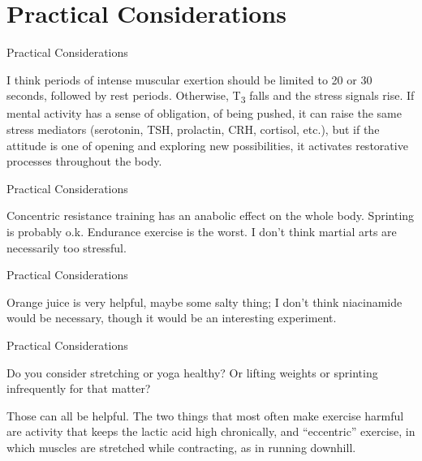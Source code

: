 \documentclass[11pt,oneside,openany,extrafontsizes]{memoir}
\begin{document}
\section{Practical Considerations}

\begin{standalonequote}{Practical Considerations}

    \begin{answer}
        I think periods of intense muscular exertion should be limited to 20 or 30 seconds, followed by rest periods. Otherwise, T\textsubscript{3} falls and the stress signals rise. If mental activity has a sense of obligation, of being pushed, it can raise the same stress mediators (serotonin, TSH, prolactin, CRH, cortisol, etc.), but if the attitude is one of opening and exploring new possibilities, it activates restorative processes throughout the body.
    \end{answer}
\end{standalonequote}

\begin{standalonequote}{Practical Considerations}

    \begin{answer}
        Concentric resistance training has an anabolic effect on the whole body. Sprinting is probably o.k. Endurance exercise is the worst. I don't think martial arts are necessarily too stressful.
    \end{answer}
\end{standalonequote}

\begin{standalonequote}{Practical Considerations}

    \begin{answer}
        Orange juice is very helpful, maybe some salty thing; I don't think niacinamide would be necessary, though it would be an interesting experiment.
    \end{answer}
\end{standalonequote}

\begin{qaexchange}{Practical Considerations}

    \begin{question}
        Do you consider stretching or yoga healthy? Or lifting weights or sprinting infrequently for that matter?
    \end{question}

    \begin{answer}
        Those can all be helpful. The two things that most often make exercise harmful are activity that keeps the lactic acid high chronically, and \enquote{eccentric} exercise, in which muscles are stretched while contracting, as in running downhill.
    \end{answer}
\end{qaexchange}
\end{document}
